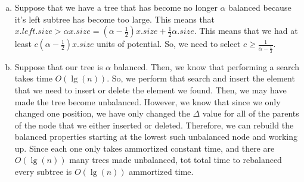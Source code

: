 \documentclass{article}
\begin{document}
\begin{enumerate}[a.]
 \item
Suppose that we have a tree that has become no longer $\alpha$ balanced because it's left subtree has become too large. This means that $x.left.size > \alpha x.size = (\alpha -\frac{1}{2}) x.size + \frac{1}{2} \alpha.size$. This means that we had at least $c(\alpha -\frac{1}{2}) x.size$ units of potential. So, we need to select $c \ge \frac{1}{\alpha -\frac{1}{2}}$. 
 \item
 Suppose that our tree is $\alpha$ balanced. Then, we know that performing a search takes time $O(\lg(n))$. So, we perform that search and insert the element that we need to insert or delete the element we found. Then, we may have made the tree become unbalanced. However, we know that since we only changed one position, we have only changed the $\Delta$ value for all of the parents of the node that we either inserted or deleted. Therefore, we can rebuild the balanced properties starting at the lowest such unbalanced node and working up. Since each one only takes ammortized constant time, and there are $O(\lg(n))$ many trees made unbalanced, tot total time to rebalanced every subtree is $O(\lg(n))$ ammortized time.
 
 
\end{enumerate}
\end{document}
